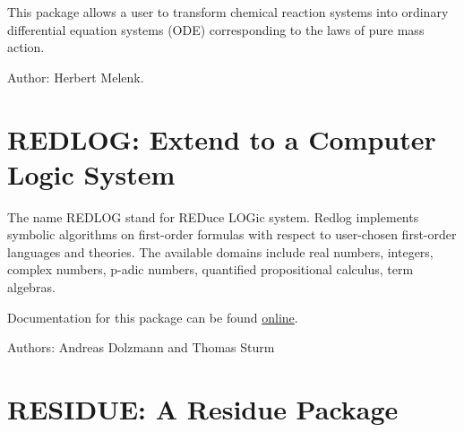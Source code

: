 
This package allows a user to transform chemical reaction systems into
ordinary differential equation systems (ODE) corresponding to the laws of
pure mass action.


Author: Herbert Melenk.



\newpage

\section{REDLOG: Extend \REDUCE{} to a Computer Logic System}


The name REDLOG stand for REDuce LOGic system. Redlog implements
symbolic algorithms on first-order formulas with respect to
user-chosen first-order languages and theories. The available domains
include real numbers, integers, complex numbers, p-adic numbers,
quantified propositional calculus, term algebras.

Documentation for this package can be found \href{http://redlog.eu/}{online}.

Authors: Andreas Dolzmann and Thomas Sturm


\iffalse
\section{RESET: Code to Reset \REDUCE to its Initial State}
\indexpackage{RESET}

This package defines a command RESETREDUCE that works through the
history of previous commands, and clears any values which have been
assigned, plus any rules, arrays and the like.  It also sets the various
switches to their initial values.  It is not complete, but does work for
most things that cause a gradual loss of space.  It would be relatively
easy to make it interactive, so allowing for selective resetting.

There is no further documentation on this package.

Author: John Fitch.

\fi

\newpage
\iffalse
\section{RESIDUE: A Residue Package}

